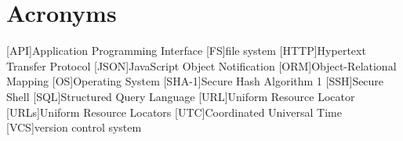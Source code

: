 \chapter*{Acronyms}
\begin{acronym}
    [API]{Application Programming Interface}
    [FS]{file system}
    [HTTP]{Hypertext Transfer Protocol}
    [JSON]{JavaScript Object Notification}
    [ORM]{Object-Relational Mapping}
    [OS]{Operating System}
    [SHA-1]{Secure Hash Algorithm 1}
    [SSH]{Secure Shell}
    [SQL]{Structured Query Language}
    [URL]{Uniform Resource Locator}
    [URLs]{Uniform Resource Locators}
    [UTC]{Coordinated Universal Time}
    [VCS]{version control system}
\end{acronym}
